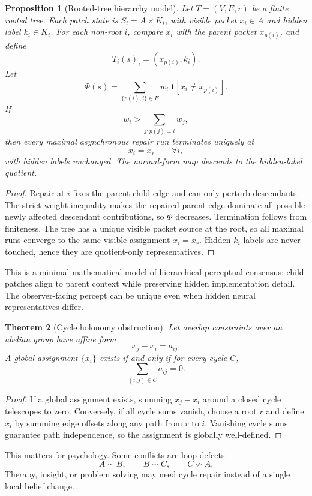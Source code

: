 \documentclass[11pt]{article}
\newtheorem{theorem}{Theorem}[section]
\newtheorem{proposition}[theorem]{Proposition}
\theoremstyle{remark}
\theoremstyle{plain}
\begin{document}
\begin{proposition}[Rooted-tree hierarchy model]
Let \(T=(V,E,r)\) be a finite rooted tree. Each patch state is \(S_i=A\times K_i\), with visible packet \(x_i\in A\) and hidden label \(k_i\in K_i\). For each non-root \(i\), compare \(x_i\) with the parent packet \(x_{p(i)}\), and define
\[
T_i(s)_i=(x_{p(i)},k_i).
\]
Let
\[
\Phi(s)=
\sum_{\{p(i),i\}\in E}
w_i\,\mathbf 1[x_i\ne x_{p(i)}].
\]
If
\[
w_i>\sum_{j:p(j)=i}w_j,
\]
then every maximal asynchronous repair run terminates uniquely at
\[
x_i=x_r\qquad\forall i,
\]
with hidden labels unchanged. The normal-form map descends to the hidden-label quotient.
\end{proposition}

\begin{proof}
Repair at \(i\) fixes the parent-child edge and can only perturb descendants. The strict weight inequality makes the repaired parent edge dominate all possible newly affected descendant contributions, so \(\Phi\) decreases. Termination follows from finiteness. The tree has a unique visible packet source at the root, so all maximal runs converge to the same visible assignment \(x_i=x_r\). Hidden \(k_i\) labels are never touched, hence they are quotient-only representatives.
\end{proof}

This is a minimal mathematical model of hierarchical perceptual consensus: child patches align to parent context while preserving hidden implementation detail. The observer-facing percept can be unique even when hidden neural representatives differ.

\begin{theorem}[Cycle holonomy obstruction]
Let overlap constraints over an abelian group have affine form
\[
x_j-x_i=a_{ij}.
\]
A global assignment \(\{x_i\}\) exists if and only if for every cycle \(C\),
\[
\sum_{(i,j)\in C}a_{ij}=0.
\]
\end{theorem}

\begin{proof}
If a global assignment exists, summing \(x_j-x_i\) around a closed cycle telescopes to zero. Conversely, if all cycle sums vanish, choose a root \(r\) and define \(x_i\) by summing edge offsets along any path from \(r\) to \(i\). Vanishing cycle sums guarantee path independence, so the assignment is globally well-defined.
\end{proof}

This matters for psychology. Some conflicts are loop defects:
\[
A\sim B,\qquad B\sim C,\qquad C\not\sim A.
\]
Therapy, insight, or problem solving may need cycle repair instead of a single local belief change.
\end{document}

